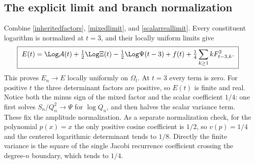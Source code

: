 \subsection{The explicit limit and branch normalization}
Combine \eqref{inheritedfactors}, \eqref{mixedlimit}, and
\eqref{scalarreallimit}. Every constituent logarithm is normalized at
$t=3$, and their locally uniform limits give
\begin{equation}\label{Eexplicit}
 \boxed{\ E(t)=\Log\mathcal A(t)+\tfrac12\Log\Xi(t)
       -\tfrac12\Log\Psi(t-3)+f(t)
       +\tfrac14\sum_{k\ge1}kF_{t-3,k}^2.\ }
\end{equation}
This proves $E_n\to E$ locally uniformly on $\Omega_t$.
At $t=3$ every term is zero. For positive $t$ the three determinant
factors are positive, so $E(t)$ is finite and real. Notice both the
minus sign of the mixed factor and the scalar coefficient $1/4$:
one first solves $S_n/Q_n^2\to\Psi$ for $\log Q_n$, and then
halves the scalar variance term. These fix the amplitude normalization.
As a separate normalization check, for the polynomial $p(x)=x$ the
only positive cosine coefficient is $1/2$, so $v(p)=1/4$ and the
centered logarithmic determinant tends to $1/8$. Directly the finite
variance is the square of the single Jacobi recurrence coefficient
crossing the degree-$n$ boundary, which tends to $1/4$.
